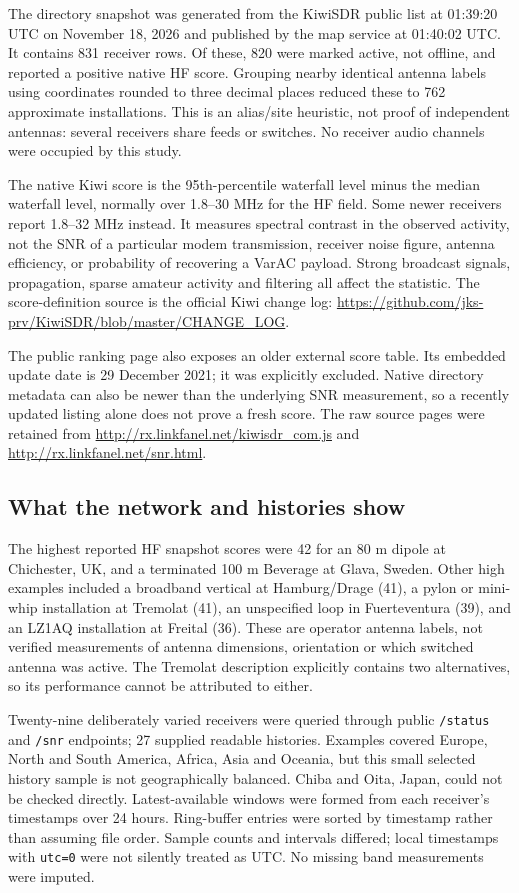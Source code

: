 \documentclass[11pt,a4paper]{article}
\begin{document}
The directory snapshot was generated from the KiwiSDR public list at
01:39:20 UTC on November 18, 2026 and published by the map service at
01:40:02 UTC. It contains 831 receiver rows. Of these, 820 were marked active,
not offline, and reported a positive native HF score. Grouping nearby identical
antenna labels using coordinates rounded to three decimal places reduced
these to 762 approximate installations. This is an alias/site heuristic,
not proof of independent antennas: several receivers share feeds or switches.
No receiver audio channels were occupied by this study.

The native Kiwi score is the 95th-percentile waterfall level minus the median
waterfall level, normally over 1.8--30 MHz for the HF field. Some newer
receivers report 1.8--32 MHz instead. It measures spectral contrast in the
observed activity, not the SNR of a particular modem transmission, receiver
noise figure, antenna efficiency, or probability of recovering a VarAC payload.
Strong broadcast signals, propagation, sparse amateur activity and filtering
all affect the statistic. The score-definition source is the official Kiwi
change log: \url{https://github.com/jks-prv/KiwiSDR/blob/master/CHANGE_LOG}.

The public ranking page also exposes an older external score table. Its
embedded update date is 29 December 2021; it was explicitly excluded.
Native directory metadata can also be newer than the underlying SNR
measurement, so a recently updated listing alone does not prove a fresh score.
The raw source pages were retained from
\url{http://rx.linkfanel.net/kiwisdr_com.js} and
\url{http://rx.linkfanel.net/snr.html}.

\subsection{What the network and histories show}
The highest reported HF snapshot scores were 42 for an 80 m dipole at
Chichester, UK, and a terminated 100 m Beverage at Glava, Sweden. Other high
examples included a broadband vertical at Hamburg/Drage (41), a pylon or
mini-whip installation at Tremolat (41), an unspecified loop in Fuerteventura
(39), and an LZ1AQ installation at Freital (36). These are operator antenna
labels, not verified measurements of antenna dimensions, orientation or
which switched antenna was active. The Tremolat description explicitly
contains two alternatives, so its performance cannot be attributed to either.

Twenty-nine deliberately varied receivers were queried through public
\texttt{/status} and \texttt{/snr} endpoints; 27 supplied readable histories.
Examples covered Europe, North and South America, Africa, Asia and Oceania, but
this small selected history sample is not geographically balanced. Chiba and Oita,
Japan, could not be checked directly. Latest-available windows were formed
from each receiver's timestamps over 24 hours. Ring-buffer entries were
sorted by timestamp rather than assuming file order. Sample counts and
intervals differed; local timestamps with \texttt{utc=0} were not silently
treated as UTC. No missing band measurements were imputed.
\end{document}
